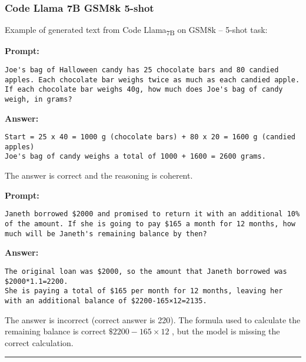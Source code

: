 \subsubsection*{Code Llama 7B GSM8k 5-shot}
\noindent Example of generated text from Code Llama\textsubscript{7B} on GSM8k -- 5-shot task:
\begin{displayquote}
	\textbf{Prompt:}
	\begin{Verbatim}[fontsize=\small,breaklines]
Joe's bag of Halloween candy has 25 chocolate bars and 80 candied apples. Each chocolate bar weighs twice as much as each candied apple. If each chocolate bar weighs 40g, how much does Joe's bag of candy weigh, in grams?
	\end{Verbatim}
	\textbf{Answer:}
	\begin{Verbatim}[fontsize=\small,breaklines]
Start = 25 x 40 = 1000 g (chocolate bars) + 80 x 20 = 1600 g (candied apples)
Joe's bag of candy weighs a total of 1000 + 1600 = 2600 grams.
	\end{Verbatim}
\end{displayquote}
The answer is correct and the reasoning is coherent.
\begin{displayquote}
	\textbf{Prompt:}
	\begin{Verbatim}[fontsize=\small,breaklines]
Janeth borrowed $2000 and promised to return it with an additional 10% of the amount. If she is going to pay $165 a month for 12 months, how much will be Janeth's remaining balance by then?
	\end{Verbatim}
	\textbf{Answer:}
	\begin{Verbatim}[fontsize=\small,breaklines]
The original loan was $2000, so the amount that Janeth borrowed was $2000*1.1=2200.
She is paying a total of $165 per month for 12 months, leaving her with an additional balance of $2200-165×12=2135.
	\end{Verbatim}
\end{displayquote}
The answer is incorrect (correct answer is 220).
The formula used to calculate the remaining balance is correct $\$2200-165\times12$ , but the model is missing the correct calculation.

	\noindent\rule{\textwidth}{0.4pt}

